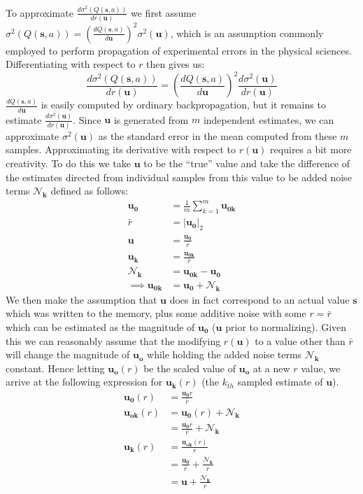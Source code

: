 \documentclass{article}
\begin{document}
To approximate $\frac{d\sigma^2(Q(\pmb{s},a))}{dr(\pmb{u})}$ we first assume $\sigma^2(Q(\pmb{s},a)) = \left(\frac{dQ(\pmb{s},a)}{d\pmb{u}}\right)^2\sigma^2(\pmb{u})$, which is an assumption commonly employed to perform propagation of experimental errors in the physical sciences. Differentiating with respect to $r$ then gives us: 
$$\frac{d\sigma^2(Q(\pmb{s},a))}{dr(\pmb{u})} = \left(\frac{dQ(\pmb{s},a)}{d\pmb{u}}\right)^2\frac{d\sigma^2(\pmb{u})}{dr(\pmb{u})}$$
$\frac{dQ(\pmb{s},a)}{d\pmb{u}}$ is easily computed by ordinary backpropagation, but it remains to estimate $\frac{d\sigma^2(\pmb{u})}{dr(\pmb{u})}$. Since $\pmb{u}$ is generated from $m$ independent estimates, we can approximate $\sigma^2(\pmb{u})$ as the standard error in the mean computed from these $m$ samples. Approximating its derivative with respect to $r(\pmb{u})$ requires a bit more creativity. To do this we take $\pmb{u}$ to be the ``true'' value and take the difference of the estimates directed from individual samples from this value to be added noise terms $\pmb{\mathcal{N}_k}$ defined as follows:
\begin{align*}
\pmb{u_0}&=\frac{1}{m}\sum_{k=1}^m\pmb{u_{0k}}\\
\bar{r}&=|\pmb{u_0}|_2\\
\pmb{u}&=\frac{\pmb{u_0}}{\bar{r}}\\
\pmb{u_k} &= \frac{\pmb{u_{0k}}}{\bar{r}}\\
\pmb{\mathcal{N}_k}&=\pmb{u_{0k}}-\pmb{u_0}\\
\implies\pmb{u_{0k}}&=\pmb{u_0}+\pmb{\mathcal{N}_k}
\end{align*}
We then make the assumption that $\pmb{u}$ does in fact correspond to an actual value $\pmb{s}$ which was written to the memory, plus some additive noise with some $r=\bar{r}$ which can be estimated as the magnitude of $\pmb{u_0}$ ($\pmb{u}$ prior to normalizing). Given this we can reasonably assume that the modifying $r(\pmb{u})$ to a value other than $\bar{r}$ will change the magnitude of $\pmb{u_o}$ while holding the added noise terms $\pmb{\mathcal{N}_k}$ constant. Hence letting $\pmb{u_o}(r)$ be the scaled value of $\pmb{u_o}$ at a new $r$ value, we arrive at the following expression for $\pmb{u_k}(r)$ (the $k_{th}$ sampled estimate of $\pmb{u}$).
\begin{align*}
\pmb{u_0}(r) &= \frac{\pmb{u_0}r}{\bar{r}}\\
\pmb{u_{ok}}(r) &= \pmb{u_0}(r)+\pmb{\mathcal{N}_k}\\
&=\frac{\pmb{u_0}r}{\bar{r}}+\pmb{\mathcal{N}_k}\\
\pmb{u_k}(r) &= \frac{\pmb{u_{ok}}(r)}{r}\\
&= \frac{\pmb{u_0}}{\bar{r}}+\frac{\pmb{\mathcal{N}_k}}{r}\\
&=\pmb{u}+\frac{\pmb{\mathcal{N}_k}}{r}
\end{align*}
\end{document}
